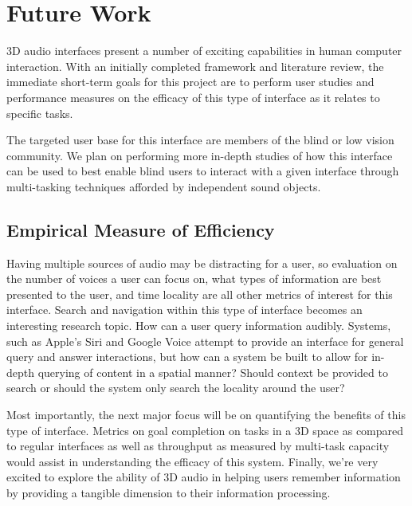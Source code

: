 \newpage                                                  \chapter{Future Work}

3D audio interfaces present a number of exciting capabilities in human computer
interaction. With an initially completed framework and literature review, the
immediate short-term goals for this project are to perform user studies and
performance measures on the efficacy of this type of interface as it relates to
specific tasks.

The targeted user base for this interface are members of the blind or low vision
community. We plan on performing more in-depth studies of how this interface can
be used to best enable blind users to interact with a given interface through
multi-tasking techniques afforded by independent sound objects.

\section{                  Empirical Measure of Efficiency                    }

Having multiple sources of audio may be distracting for a user, so evaluation on
the number of voices a user can focus on, what types of information are best
presented to the user, and time locality are all other metrics of interest for
this interface.   Search and navigation within this type of interface becomes an
interesting research topic.  How can a user query information audibly.
Systems, such as Apple’s Siri and Google Voice attempt to provide an interface
for general query and answer interactions, but how can a system be built to
allow for in-depth querying of content in a spatial manner?  Should context be
provided to search or should the system only search the locality around the
user?

Most importantly, the next major focus will be on quantifying the benefits of
this type of interface. Metrics on goal completion on tasks in a 3D space as
compared to regular interfaces as well as throughput as measured by multi-task
capacity would assist in understanding the efficacy of this system. Finally,
we’re very excited to explore the ability of 3D audio in helping users remember
information by providing a tangible dimension to their information processing.

